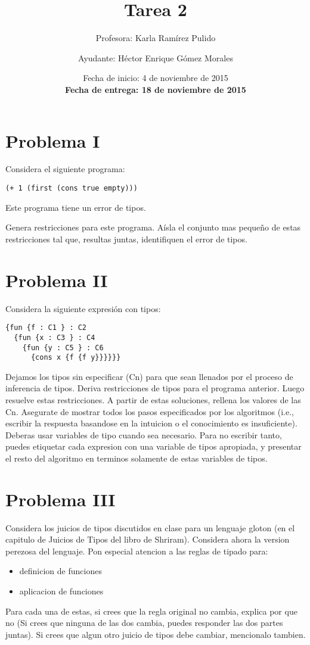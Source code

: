 \documentclass{article}
\author{Profesora: Karla Ramírez Pulido \and
  Ayudante: Héctor Enrique Gómez Morales}
\title{Tarea 2}
\date{Fecha de inicio: 4 de noviembre de 2015\\
  \textbf{Fecha de entrega: 18 de noviembre de 2015}}
\begin{document}
\maketitle
\section*{Problema I}
Considera el siguiente programa:

\begin{verbatim}
(+ 1 (first (cons true empty)))
\end{verbatim}

Este programa tiene un error de tipos.

Genera restricciones para este programa. Aísla el conjunto mas pequeño de
estas restricciones tal que, resultas juntas, identifiquen el error de tipos.

\section*{Problema II}
Considera la siguiente expresión con tipos:

\begin{verbatim}
{fun {f : C1 } : C2
  {fun {x : C3 } : C4
    {fun {y : C5 } : C6
      {cons x {f {f y}}}}}}
\end{verbatim}

Dejamos los tipos sin especificar (Cn) para que sean llenados por el proceso
de inferencia de tipos. Deriva restricciones de tipos para el programa anterior.
Luego resuelve estas restricciones. A partir de estas soluciones, rellena los
valores de las Cn. Asegurate de mostrar todos los pasos especificados por los
algoritmos (i.e., escribir la respuesta basandose en la intuicion o el conocimiento
es insuficiente). Deberas usar variables de tipo cuando sea necesario.
Para no escribir tanto, puedes etiquetar cada expresion con una variable de tipos
apropiada, y presentar el resto del algoritmo en terminos solamente de estas
variables de tipos.

\section*{Problema III}
Considera los juicios de tipos discutidos en clase para un lenguaje gloton
(en el capitulo de Juicios de Tipos del libro de Shriram). Considera ahora la
version perezosa del lenguaje. Pon especial atencion a las reglas de tipado para:

\begin{itemize}
\item definicion de funciones
\item aplicacion de funciones
\end{itemize}

Para cada una de estas, si crees que la regla original no cambia, explica por que no
(Si crees que ninguna de las dos cambia, puedes responder las dos partes juntas).
Si crees que algun otro juicio de tipos debe cambiar, mencionalo tambien.
\end{document}

